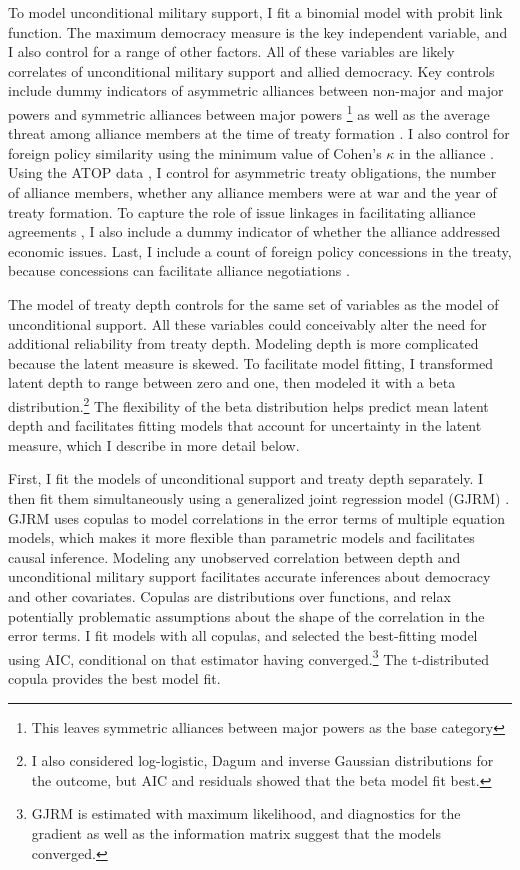 \documentclass[12pt]{article}
\begin{document}
To model unconditional military support, I fit a binomial model with probit link function. 
The maximum democracy measure is the key independent variable, and I also control for a range of other factors.
All of these variables are likely correlates of unconditional military support and allied democracy. 
Key controls include dummy indicators of asymmetric alliances between non-major and major powers and symmetric alliances between major powers \citep{Mattes2012}\footnote{This leaves symmetric alliances between major powers as the base category} as well as the average threat among alliance members at the time of treaty formation \citep{LeedsSavun2007}. 
I also control for foreign policy similarity \citep{Benson2012} using the minimum value of Cohen's $\kappa$ in the alliance \citep{Hage2011}.
Using the ATOP data \citep{Leedsetal2002}, I control for asymmetric treaty obligations, the number of alliance members, whether any alliance members were at war and the year of treaty formation. 
To capture the role of issue linkages in facilitating alliance agreements \citep{Poast2012, Poast2013}, I also include a dummy indicator of whether the alliance addressed economic issues.  
Last, I include a count of foreign policy concessions in the treaty, because concessions can facilitate alliance negotiations \citep{Johnson2015}. 


The model of treaty depth controls for the same set of variables as the model of unconditional support. 
All these variables could conceivably alter the need for additional reliability from treaty depth. 
Modeling depth is more complicated because the latent measure is skewed.
To facilitate model fitting, I transformed latent depth to range between zero and one, then modeled it with a beta distribution.\footnote{I also considered log-logistic, Dagum and inverse Gaussian distributions for the outcome, but AIC and residuals showed that the beta model fit best.}
The flexibility of the beta distribution helps predict mean latent depth and facilitates fitting models that account for uncertainty in the latent measure, which I describe in more detail below. 


First, I fit the models of unconditional support and treaty depth separately. 
I then fit them simultaneously using a generalized joint regression model (GJRM) \citep{Braumoelleretal2018}.
GJRM uses copulas to model correlations in the error terms of multiple equation models, which makes it more flexible than parametric models and facilitates causal inference. 
Modeling any unobserved correlation between depth and unconditional military support facilitates accurate inferences about democracy and other covariates. 
Copulas are distributions over functions, and relax potentially problematic assumptions about the shape of the correlation in the error terms. 
I fit models with all copulas, and selected the best-fitting model using AIC, conditional on that estimator having converged.\footnote{GJRM is estimated with maximum likelihood, and diagnostics for the gradient as well as the information matrix suggest that the models converged.} 
The t-distributed copula provides the best model fit.
\end{document}
